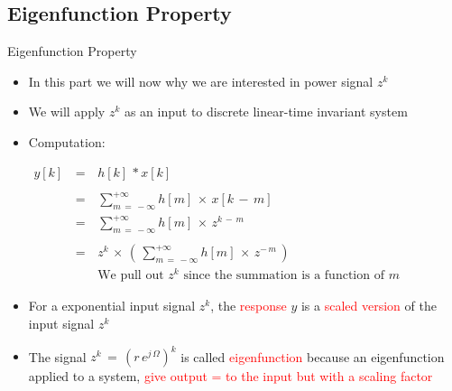 \documentclass{beamer}
\begin{document}
\subsection{Eigenfunction Property} 
\begin{frame}[t,allowframebreaks]{Eigenfunction Property}

\begin{itemize}

\item In this part we will now why we are interested in power signal $z^k$ 

\item We will apply $z^k$ as an input to discrete linear-time invariant system

\item Computation:


$\begin{array}{rcl}
y[k] \, &=& \, h[k] \, * x[k] \\ \\
		&=& \, \displaystyle\sum_{m \, = \, - \infty}^{+ \infty} h[m] \, \times \, x[k \, - \, m] \\
		&=& \, \displaystyle\sum_{m \, = \, - \infty}^{+ \infty} h[m] \, \times \, z^{k \, - \, m} \\ \\
		&=& \, z^k \, \times \, \left(\, \displaystyle\sum_{m \, = \, - \infty}^{+ \infty} h[m] \, \times \, z^{- \, m} \, \right)\\
		&& \, \text{We pull out } z^k \text{ since the summation is a function of } m
\end{array}$

\item For a exponential input signal $z^k$, the \textcolor{red}{response} $y$ is a \textcolor{red}{scaled version} of the input signal $z^k$

\item The signal  $z^k \, = \, (r \, e^{j \, \Omega})^k$ is called \textcolor{red}{eigenfunction} because an eigenfunction applied to a system, \textcolor{red}{give output = to the input but with a scaling factor}

\end{itemize}


\end{frame}
\end{document}
